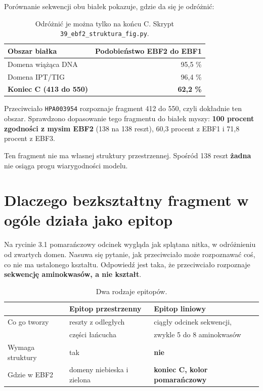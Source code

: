 \documentclass[a4paper,11pt]{report}
\begin{document}
Porównanie sekwencji obu białek pokazuje, gdzie da się je odróżnić:

\begin{table}[h]
\centering
\begin{tabular}{lr}
\toprule
Obszar białka & Podobieństwo EBF2 do EBF1 \\
\midrule
Domena wiążąca DNA & 95,5 \% \\
Domena IPT/TIG & 96,4 \% \\
\textbf{Koniec C (413 do 550)} & \textbf{62,2 \%} \\
\bottomrule
\end{tabular}
\caption{Odróżnić je można tylko na końcu C. Skrypt \texttt{39\_ebf2\_struktura\_fig.py}.}
\end{table}

Przeciwciało \texttt{HPA003954} rozpoznaje fragment 412 do 550, czyli dokładnie ten
obszar. Sprawdzono dopasowanie tego fragmentu do białek myszy:
\textbf{100 procent zgodności z mysim EBF2} (138 na 138 reszt), 60,3 procent z EBF1
i 71,8 procent z EBF3.

Ten fragment nie ma własnej struktury przestrzennej. Spośród 138 reszt
\textbf{żadna} nie osiąga progu wiarygodności modelu.

\section{Dlaczego bezkształtny fragment w ogóle działa jako epitop}

Na rycinie 3.1 pomarańczowy odcinek wygląda jak splątana nitka, w odróżnieniu
od zwartych domen. Nasuwa się pytanie, jak przeciwciało może rozpoznawać coś,
co nie ma ustalonego kształtu. Odpowiedź jest taka, że przeciwciało rozpoznaje
\textbf{sekwencję aminokwasów, a nie kształt}.

\begin{table}[h]
\centering
\begin{tabular}{lll}
\toprule
 & Epitop przestrzenny & \textbf{Epitop liniowy} \\
\midrule
Co go tworzy & reszty z odległych & ciągły odcinek sekwencji, \\
             & części łańcucha & zwykle 5 do 8 aminokwasów \\
Wymaga struktury & tak & \textbf{nie} \\
Gdzie w EBF2 & domeny niebieska i zielona & \textbf{koniec C, kolor pomarańczowy} \\
\bottomrule
\end{tabular}
\caption{Dwa rodzaje epitopów.}
\end{table}
\end{document}
